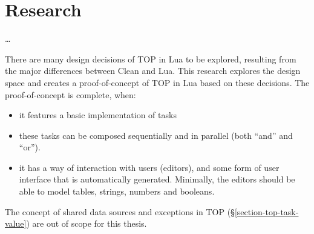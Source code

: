 \chapter{Research}\label{research}

\dots{}

There are many design decisions of TOP in Lua to be explored, resulting from the major differences between Clean and Lua. This research explores the design space and creates a proof-of-concept of TOP in Lua based on these decisions. The proof-of-concept is complete, when:
\begin{itemize}
    \item it features a basic implementation of tasks
    \item these tasks can be composed sequentially and in parallel (both ``and'' and ``or'').
    \item it has a way of interaction with users (editors), and some form of user interface that is automatically generated. Minimally, the editors should be able to model tables, strings, numbers and booleans.
\end{itemize}

The concept of shared data sources and exceptions in TOP (\S \ref{section-top-task-value}) are out of scope for this thesis.






% 



